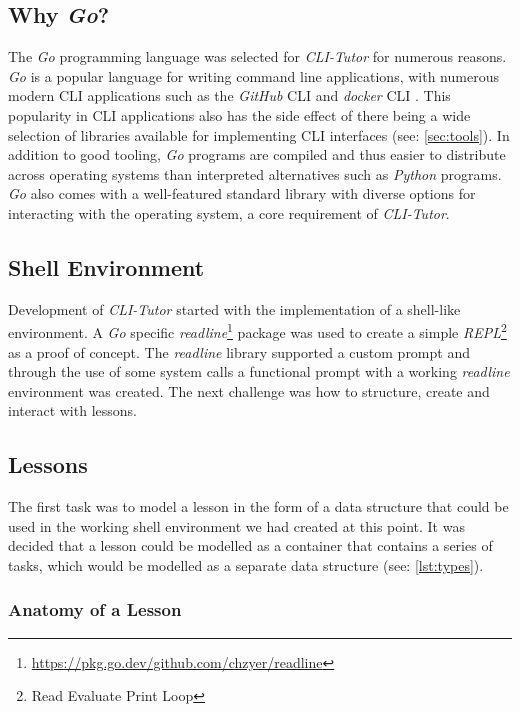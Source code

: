 \subsection{Why \textit{Go}?} The \textit{Go} programming language was selected
for \textit{CLI-Tutor} for numerous reasons. \textit{Go} is a popular language
for writing command line applications, with numerous modern CLI applications
such as the \textit{GitHub} CLI \cite{github_cli} and \textit{docker} CLI
\cite{dockerinc_2022}. This popularity in CLI applications also has the side
effect of there being a wide selection of libraries available for implementing
CLI interfaces (see: \autoref{sec:tools}). In addition to good tooling,
\textit{Go} programs are compiled and thus easier to distribute across
operating systems than interpreted alternatives such as \textit{Python}
programs. \textit{Go} also comes with a well-featured standard library with
diverse options for interacting with the operating system, a core requirement
of \textit{CLI-Tutor}.


\subsection{Shell Environment}

Development of \textit{CLI-Tutor} started with the implementation of a
shell-like environment. A  \textit{Go} specific
\textit{readline}\footnote{\url{https://pkg.go.dev/github.com/chzyer/readline}}
package was used to create a simple \textit{REPL}\footnote{Read Evaluate Print
Loop} as a proof of concept. The \textit{readline} library supported a custom
prompt and through the use of some system calls a functional prompt with a
working \textit{readline} environment was created. The next challenge was how
to structure, create and interact with lessons.

\subsection{Lessons}

The first task was to model a lesson in the form of a data structure that could
be used in the working shell environment we had created at this point. It was
decided that a lesson could be modelled as a container that contains a series of
tasks, which would be modelled as a separate data structure (see: \autoref{lst:types}).

\subsubsection{Anatomy of a Lesson}


